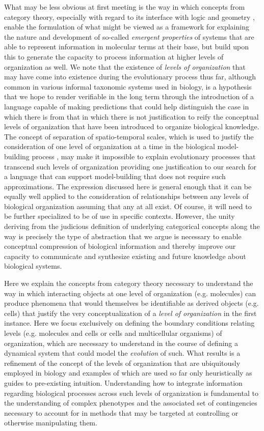 \documentclass[aps,twocolumn]{revtex4-1}
\begin{document}
What may be less obvious at first meeting is the way in which concepts from category theory, especially with regard to its interface with logic and geometry \cite{MacLane1992,Jacobs1998}, enable the formulation of what might be viewed as a framework for explaining the nature and development of so-called \emph{emergent properties} of systems that are able to represent information in molecular terms at their base, but build upon this to generate the capacity to process information at higher levels of organization as well. We note that the existence of {\it levels of organization} that may have come into existence during the evolutionary process thus far, although common in various informal taxonomic systems used in biology, is a hypothesis that we hope to render verifiable in the long term through the introduction of a language capable of making predictions that could help distinguish the case in which there is from that in which there is not justification to reify the conceptual levels of organization that have been introduced to organize biological knowledge. The concept of separation of spatio-temporal scales, which is used to justify the consideration of one level of organization at a time in the biological model-building process \cite{Gunawardena2012,Karr2012}, may make it impossible to explain evolutionary processes that transcend such levels of organization providing one justification to our search for a language that can support model-building that does not require such approximations. The expression discussed here is general enough that it can be equally well applied to the consideration of relationships between any levels of biological organization assuming that any at all exist. Of course, it will need to be further specialized to be of use in specific contexts. However, the unity deriving from the judicious definition of underlying categorical concepts along the way is precisely the type of abstraction that we argue is necessary to enable conceptual compression of biological information and thereby improve our capacity to communicate and synthesize existing and future knowledge about biological systems.

Here we explain the concepts from category theory necessary to understand the way in which interacting objects at one level of organization (e.g. molecules) can produce phenomena that would themselves be identifiable as derived objects (e.g. cells) that justify the very conceptualization of a \emph{level of organization} in the first instance. Here we focus exclusively on defining the boundary conditions relating levels (e.g. molecules and cells or cells and multicellular organisms) of organization, which are necessary to understand in the course of defining a dynamical system that could model the \emph{evolution} of such. What results is a refinement of the concept of the levels of organization that are ubiquitously employed in biology and examples of which are used so far only heuristically as guides to pre-existing intuition. Understanding how to integrate information regarding biological processes across such levels of organization is fundamental to the understanding of complex phenotypes and the associated set of contingencies necessary to account for in methods that may be targeted at controlling or otherwise manipulating them.
\end{document}
